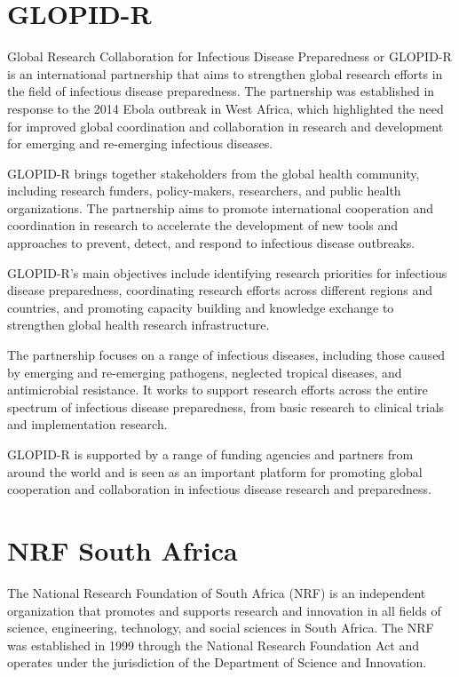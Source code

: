 \documentclass[
]{book}
\begin{document}
\hypertarget{glopidr}{%
\section{GLOPID-R}\label{glopidr}}

Global Research Collaboration for Infectious Disease Preparedness or GLOPID-R is an international partnership that aims to strengthen global research efforts in the field of infectious disease preparedness. The partnership was established in response to the 2014 Ebola outbreak in West Africa, which highlighted the need for improved global coordination and collaboration in research and development for emerging and re-emerging infectious diseases.

GLOPID-R brings together stakeholders from the global health community, including research funders, policy-makers, researchers, and public health organizations. The partnership aims to promote international cooperation and coordination in research to accelerate the development of new tools and approaches to prevent, detect, and respond to infectious disease outbreaks.

GLOPID-R's main objectives include identifying research priorities for infectious disease preparedness, coordinating research efforts across different regions and countries, and promoting capacity building and knowledge exchange to strengthen global health research infrastructure.

The partnership focuses on a range of infectious diseases, including those caused by emerging and re-emerging pathogens, neglected tropical diseases, and antimicrobial resistance. It works to support research efforts across the entire spectrum of infectious disease preparedness, from basic research to clinical trials and implementation research.

GLOPID-R is supported by a range of funding agencies and partners from around the world and is seen as an important platform for promoting global cooperation and collaboration in infectious disease research and preparedness.

\hypertarget{nrfza}{%
\section{NRF South Africa}\label{nrfza}}

The National Research Foundation of South Africa (NRF) is an independent organization that promotes and supports research and innovation in all fields of science, engineering, technology, and social sciences in South Africa. The NRF was established in 1999 through the National Research Foundation Act and operates under the jurisdiction of the Department of Science and Innovation.
\end{document}
